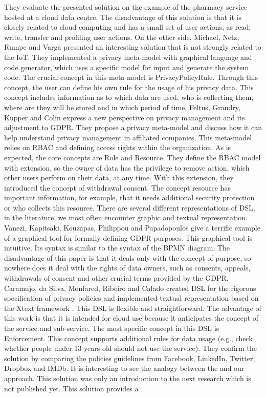 \documentclass[11pt,english]{article}
\begin{document}
They evaluate the presented solution on the example of the pharmacy service hosted at a cloud data centre. The disadvantage of this solution is that it is closely related to cloud computing and has a small set of user actions, as read, write, transfer and profiling user actions. On the other side, Michael, Netz, Rumpe and Varga \cite{michael2019towards} presented an interesting solution that is not strongly related to the IoT. They implemented a privacy meta-model with graphical language and code generator, which uses a specific model for input and generate the system code. The crucial concept in this meta-model is PrivacyPolicyRule. Through this concept, the user can define his own rule for the usage of his privacy data. This concept includes information as to which data are used, who is collecting them, where are they will be stored and in which period of time. \newline Feltus, Grandry, Kupper and Colin \cite{feltus2017model} express a new perspective on privacy management and its adjustment to GDPR. They propose a privacy meta-model and discuss how it can help understand privacy management in affiliated companies. This meta-model relies on RBAC and defining access rights within the organization. As is expected, the core concepts are Role and Resource. They define the RBAC model with extension, so the owner of data has the privilege to remove action, which other users perform on their data, at any time. With this extension, they introduced the concept of withdrawal consent. The concept resource has important information, for example, that it needs additional security protection or who collects this resource. \newline There are several different representations of DSL, in the literature, we most often encounter graphic and textual representation. Vanezi, Kapitsaki, Kouzapas, Philippou and Papadopoulos \cite{vanezi2020dialogop} give a terrific example of a graphical tool for formally defining GDPR purposes. This graphical tool is intuitive. Its syntax is similar to the syntax of the BPMN diagram. The disadvantage of this paper is that it deals only with the concept of purpose, so nowhere does it deal with the rights of data owners, such as consents, appeals, withdrawals of consent and other crucial terms provided by the GDPR. Caramujo, da Silva, Monfared, Ribeiro and Calado \cite{caramujo2019rsl} created DSL for the rigorous specification of privacy policies and implemented textual representation based on the Xtext framework \cite{bettini2016implementing}. This DSL is flexible and straightforward. The advantage of this work is that it is intended for cloud use because it anticipates the concept of the service and sub-service. The most specific concept in this DSL is Enforcement. This concept supports additional rules for data usage (e.g., check whether people under 13 years old should not use the service). They confirm the solution by comparing the policies guidelines from Facebook, LinkedIn, Twitter, Dropbox and IMDb. \newline It is interesting to see the analogy between the \cite{torre2019using} and our approach. This solution was only an introduction to the next research  \cite{modeldrivengdpr} which is not published yet. This solution provides a 
\end{document}
